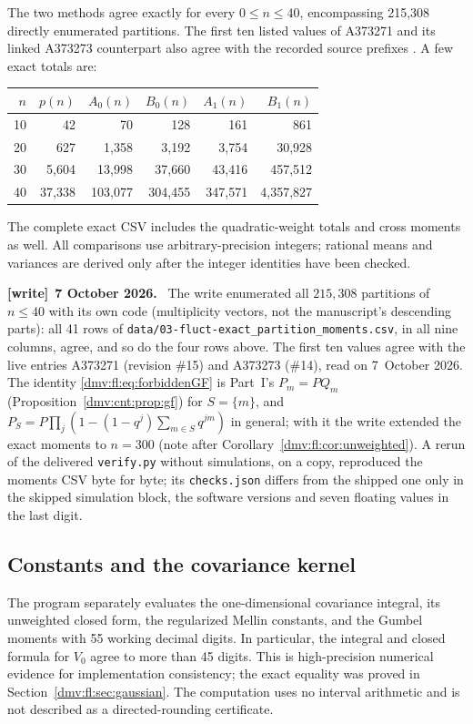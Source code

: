 \documentclass[11pt,letterpaper]{article}
\numberwithin{equation}{section}
\theoremstyle{definition}\newtheorem{definition}[theorem]{Definition}
\theoremstyle{remark}\newtheorem{remark}[theorem]{Remark}
\newcommand{\file}[1]{\nolinkurl{#1}}
\newenvironment{writenote}[1][]{\par\smallskip\begingroup\small
 \noindent\textbf{[write]}\if\relax\detokenize{#1}\relax\else~\textbf{#1.}\fi\ }%
 {\par\endgroup\smallskip}
\begin{document}
The two methods agree exactly for every $0\le n\le40$, encompassing
215,308 directly enumerated partitions. The first ten listed values
of A373271 and its linked A373273 counterpart also agree with the
recorded source prefixes \cite{oeisA373271,oeisA373273}. A few exact totals are:
\begin{center}
\begin{tabular}{@{}rrrrrr@{}}
\toprule
$n$ & $p(n)$ & $A_0(n)$ & $B_0(n)$ & $A_1(n)$ & $B_1(n)$\\
\midrule
10 & 42 & 70 & 128 & 161 & 861\\
20 & 627 & 1,358 & 3,192 & 3,754 & 30,928\\
30 & 5,604 & 13,998 & 37,660 & 43,416 & 457,512\\
40 & 37,338 & 103,077 & 304,455 & 347,571 & 4,357,827\\
\bottomrule
\end{tabular}
\end{center}
The complete exact CSV includes the quadratic-weight totals and cross
moments as well. All comparisons use arbitrary-precision integers;
rational means and variances are derived only after the integer
identities have been checked.
\begin{writenote}[7 October 2026]
The write enumerated all $215{,}308$ partitions of $n\le40$ with its own
code (multiplicity vectors, not the manuscript's descending parts): all 41
rows of \file{data/03-fluct-exact_partition_moments.csv}, in all nine
columns, agree, and so do the four rows above. The first ten values agree
with the live entries A373271 (revision \#15) and A373273 (\#14), read on
7~October 2026. The identity \eqref{dmv:fl:eq:forbiddenGF} is Part~I's
$P_m=PQ_m$ (Proposition~\ref{dmv:cnt:prop:gf}) for $S=\{m\}$, and
$P_S=P\prod_j(1-(1-q^j)\sum_{m\in S}q^{jm})$ in general; with it the write
extended the exact moments to $n=300$ (note after
Corollary~\ref{dmv:fl:cor:unweighted}). A rerun of the delivered
\file{verify.py} without simulations, on a copy, reproduced the moments
CSV byte for byte; its \file{checks.json} differs from the shipped one
only in the skipped simulation block, the software versions and seven
floating values in the last digit.
\end{writenote}

\subsection{Constants and the covariance kernel}
The program separately evaluates the one-dimensional covariance
integral, its unweighted closed form, the regularized Mellin constants,
and the Gumbel moments with 55 working decimal digits. In particular,
the integral and closed formula for $V_0$ agree to more than 45 digits.
This is high-precision numerical evidence for implementation
consistency; the exact equality was proved in
Section~\ref{dmv:fl:sec:gaussian}. The computation uses no interval arithmetic
and is not described as a directed-rounding certificate.
\end{document}
